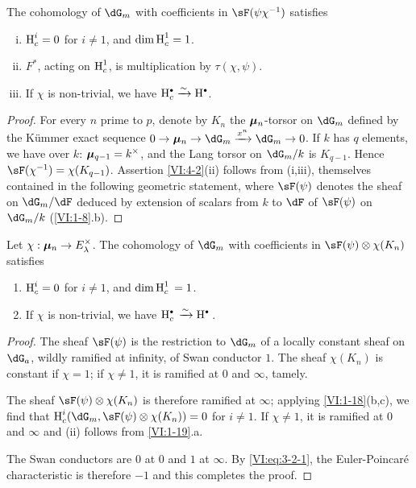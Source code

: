 \begin{proposition_}\label{VI:4-2}
The cohomology of $\dG_m$ with coefficients in $\sF(\psi\chi^{-1})$ satisfies
\begin{enumerate}[(i)]
  \item $\operatorname{H}_c^i=0$ for $i\ne 1$, and $\dim \operatorname{H}_c^1=1$.
  \item $F^\ast$, acting on $\operatorname{H}_c^1$, is multiplication by
    $\tau(\chi,\psi)$.
  \item If $\chi$ is non-trivial, we have $\h_c^\bullet \iso \h^\bullet$.
\end{enumerate}
\end{proposition_}
\begin{proof}[Proof]
For every $n$ prime to $p$, denote by $K_n$ the ${\bm\mu}_n$-torsor on $\dG_m$
defined by the K\"ummer exact sequence
$0 \to \dmu_n \to \dG_m \xrightarrow{x^n} \dG_m \to 0$. If $k$ has $q$
elements, we have over $k$: ${\bm\mu}_{q-1}=k^\times$, and the Lang torsor on
$\dG_m/k$ is $K_{q-1}$. Hence $\sF(\chi^{-1})=\chi(K_{q-1})$.
Assertion \ref{VI:4-2}(ii) follows from (i,iii), themselves contained in
the following geometric statement, where $\sF(\psi)$ denotes the sheaf
on $\dG_m/\dF$ deduced by extension of scalars from $k$ to $\dF$ of
$\sF(\psi)$ on $\dG_m/k$ (\ref{VI:1-8}.b).
\end{proof}





\begin{proposition_}\label{VI:4-3}
Let $\chi:{\bm\mu}_n \to E_\lambda^\times$. The cohomology of $\dG_m$ with
coefficients in $\sF(\psi)\otimes \chi(K_n)$ satisfies
\begin{enumerate}[\indent (i)]
  \item $\operatorname{H}_c^i=0$ for $i\ne 1$, and $\dim \operatorname{H}_c^1{} = 1$.
  \item If $\chi$ is non-trivial, we have $\h_c^\bullet{}\iso \h^\bullet{}$.
\end{enumerate}
\end{proposition_}
\begin{proof}[Proof]
The sheaf $\sF(\psi)$ is the restriction to $\dG_m$ of a locally
constant sheaf on $\dG_a$, wildly ramified at infinity, of Swan
conductor $1$. The sheaf $\chi(K_n)$ is constant if $\chi=1$; if $\chi\ne 1$, it
is ramified at $0$ and $\infty$, tamely.

The sheaf $\sF(\psi)\otimes\chi(K_n)$ is therefore ramified at $\infty$;
applying \ref{VI:1-18}(b,c), we find that
$\h_c^i(\dG_m,\sF(\psi)\otimes \chi(K_n))=0$ for $i\ne 1$. If $\chi\ne 1$, it
is ramified at $0$ and $\infty$ and (ii) follows from \ref{VI:1-19}.a.

The Swan conductors are $0$ at $0$ and $1$ at $\infty$. By
\eqref{VI:eq:3-2-1}, the Euler-Poincaré characteristic is therefore $-1$ and
this completes the proof.
\end{proof}





